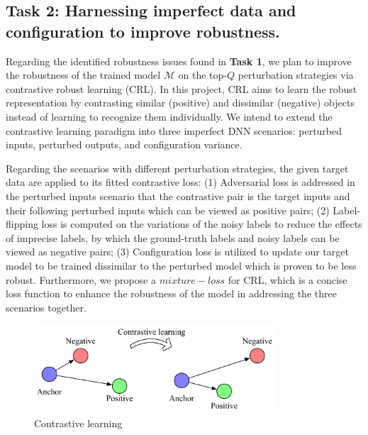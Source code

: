 \subsection{Task 2: Harnessing imperfect data and configuration to improve robustness.}

Regarding the identified robustness issues found in \textbf{Task 1}, we plan to improve the robustness of the trained model $\mathcal{M}$ on the top-$Q$ perturbation strategies via contrastive robust learning (CRL). In this project, CRL aims to learn the robust representation by contrasting similar (positive) and dissimilar (negative) objects instead of learning to recognize them individually. We intend to extend the contrastive learning paradigm into three imperfect DNN scenarios: perturbed inputs, perturbed outputs, and configuration variance. 

Regarding the scenarios with different perturbation strategies, the given target data are applied to its fitted contrastive loss: 
(1) Adversarial loss is addressed in the perturbed inputs scenario that the contrastive pair is the target inputs and their following perturbed inputs which can be viewed as positive pairs; 
(2) Label-flipping loss is computed on the variations of the noisy labels to reduce the effects of imprecise labels, by which the ground-truth labels and noisy labels can be viewed as negative pairs; 
(3) Configuration loss is utilized to update our target model to be trained dissimilar to the perturbed model which is proven to be less robust.
Furthermore, we propose a $mixture-loss$ for CRL, which is a concise loss function to enhance the robustness of the model in addressing the three scenarios together.

\begin{figure}[!h]
    \centering
    \includegraphics[width=9cm]{fig/contra.pdf}
    \caption{Contrastive learning}
    \label{fig:goal2}
\end{figure}

